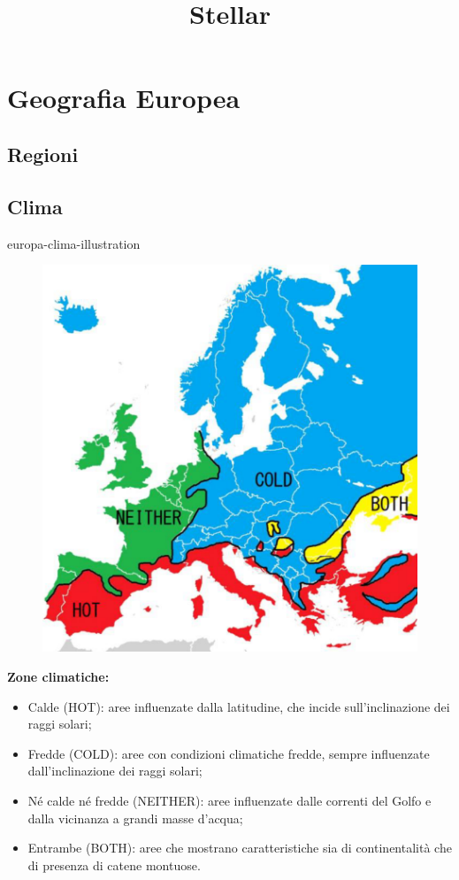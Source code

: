 \documentclass[preview]{standalone}
\begin{document}
\title{Stellar}
\genpage

\section{Geografia Europea}

\subsection{Regioni}


\subsection{Clima}

\begin{snippet}{europa-clima-illustration}
    \setlength{\intextsep}{0pt}%
    \begin{figure}
        \includegraphics[width=.5\textwidth]{resources/europa-clima.png}
    \end{figure}
    
    \textbf{Zone climatiche:}
    \begin{itemize}
        \item Calde (HOT): aree influenzate dalla latitudine, che incide
            sull'inclinazione dei raggi solari;
        \item Fredde (COLD): aree con condizioni climatiche fredde, sempre
            influenzate dall'inclinazione dei raggi solari;
        \item Né calde né fredde (NEITHER): aree influenzate dalle correnti del Golfo
            e dalla vicinanza a grandi masse d'acqua;
        \item Entrambe (BOTH): aree che mostrano caratteristiche sia di
            continentalità che di presenza di catene montuose. 
    \end{itemize}
    \wrapfill
\end{snippet}
\end{document}
